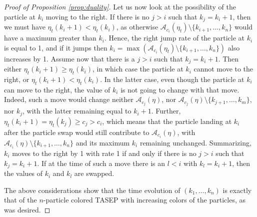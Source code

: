 \documentclass[11pt,reqno]{amsart}
\theoremstyle{definition}
\theoremstyle{remark}
\theoremstyle{remark}
\def\geq{\geqslant}
\renewcommand\ge{\geq}
\def\A{\mathcal A}
\numberwithin{equation}{section}
\begin{document}
\begin{proof}[Proof of Proposition \ref{prop:duality}]
		Let us now look at the possibility of the particle at $k_i$ moving to the right. If there is no $j>i$ such that $k_j=k_i+1$,
		then we must have $\eta_t(k_i+1)<\eta_t(k_i)$, as otherwise $\A_{c_i}(\eta_t)\setminus\{k_{i+1},\dots,k_n\}$ would have a maximum greater than $k_i$. Hence, the right jump rate of the particle at $k_i$ is equal to 1, and if it jumps then $k_i= \max(\A_{c_i}(\eta_t)\setminus\{k_{i+1},\dots,k_n\})$ also increases by 1. Assume now that there is a $j>i$ such that $k_j=k_i+1$. Then either $\eta_t(k_i+1)\ge \eta_t(k_i)$, in which case the particle at $k_i$ cannot move to the right, or $\eta_t(k_i+1)< \eta_t(k_i)$. In the latter case, even though the particle at $k_i$ can move to the right, the value of $k_i$ is not going to change with that move. Indeed, such a move would change neither $\A_{c_j}(\eta)$, nor $\A_{c_j}(\eta)\setminus\{k_{j+1},\dots,k_m\}$, nor $k_j$, with the latter remaining equal to $k_i+1$. Further, $\eta_t(k_i+1)=\eta_t(k_j)\ge c_j>c_i$, which means that the particle landing at $k_i$ after the particle swap would still contribute to $\A_{c_i}(\eta)$, with $\A_{c_i}(\eta)\setminus\{k_{i+1},\dots,k_n\}$ and its maximum $k_i$ remaining unchanged. 
		Summarizing, $k_i$ moves to the right by 1 with rate 1 if and only if there is no $j>i$ such that $k_j=k_i+1$. If at the time of such a move there is an $l<i$ with $k_l=k_i+1$, then the values of $k_i$ and $k_l$ are swapped. 
		
		The above considerations show that the time evolution of $(k_1,\dots,k_n)$ is exactly that of the $n$-particle colored TASEP with increasing colors of the particles, as was desired.  
	\end{proof}
	
\end{document}
